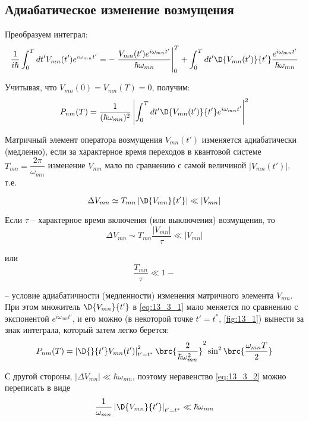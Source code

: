 \subsection{Адиабатическое изменение возмущения}

Преобразуем интеграл:
\begin{eqnarray*}
\frac{1}{i\hbar} \int_0^T dt' V_{mn}(t')e^{i\omega_{mn}t'} = -\left. \frac{V_{mn}(t')e^{i \omega_{mn}t'}}{\hbar \omega_{mn}}\right|_0^T + \int_0^T dt' \D{V_{mn}(t')}{t'} \frac{e^{i\omega_{mn}t'}}{\hbar \omega_{mn}}
\end{eqnarray*}

Учитывая, что $V_{mn}(0) = V_{mn}(T) = 0$, получим:
\begin{equation}
\label{eq:13_3_1}
P_{nm}(T) = \frac{1}{(\hbar \omega_{mn})^2} \left| \int_0^T dt' \D{V_{mn}(t')}{t'} e^{i\omega_{mn}t'}\right|^2
\end{equation}

\begin{defn}
Матричный элемент оператора возмущения $V_{mn}(t')$ изменяется адиабатически (медленно), если за характерное время переходов в квантовой системе $T_{mn} = \dfrac{2\pi}{\omega_{mn}}$ изменение $V_{mn}$ мало по сравнению с самой величиной $|V_{mn}(t')|$, т.е.
\end{defn}
\begin{equation}
\label{eq:13_3_2}
\Delta V_{mn}  \simeq T_{mn} \left| \D{V_{mn}}{t'}\right| \ll |V_{mn}|
\end{equation}

Если $\tau$ -- характерное время включения (или выключения) возмущения, то
$$
\Delta V_{mn} \sim T_{mn} \frac{|V_{mn}|}{\tau} \ll |V_{mn}| 
$$

или
$$
\boxed{\frac{T_{mn}}{\tau} \ll 1} - 
$$

-- условие адиабатичности (медленности) изменения матричного элемента $V_{mn}$. При этом множитель $\D{V_{mn}}{t'}$ в \eqref{eq:13_3_1} мало меняется по сравнению с экспонентой $e^{i\omega_{mn} t'}$, и его можно (в некоторой точке $t' = t^*$, \autoref{fig:13_1}) вынести за знак интеграла, который затем легко берется:
$$
P_{nm}(T) = \left| \D{}{t'} V_{mn}(t')\right|_{t' = t^*}^2 \brc{\frac{2}{\hbar \omega_{mn}^2}}^2 \sin^2 \brc{\frac{\omega_{mn}T}{2}}
$$

С другой стороны, $|\Delta V_{mn}| \ll \hbar \omega_{mn}$, поэтому неравенство \eqref{eq:13_3_2} можно переписать в виде
\begin{equation}
\label{eq:13_3_3}
\frac{1}{\omega_{mn}} \left| \D{V_{mn}}{t'}\right|_{t' = t^*} \ll \hbar \omega_{mn}
\end{equation}

